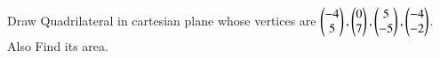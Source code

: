 Draw Quadrilateral in cartesian plane whose vertices are $\myvec{-4\\5} ,\myvec{0\\7} ,\myvec{5\\-5}, \myvec{-4\\-2}$.
\newline
Also Find its area.
